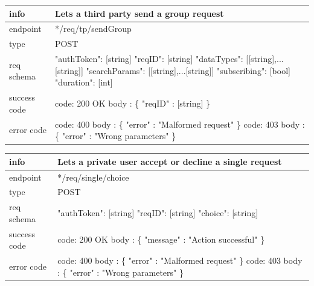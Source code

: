 \documentclass[titlepage]{article}
\begin{document}
\begin{tabularx}{\textwidth}{lX} \hline
    info & Lets a third party send a group request \\ \hline
    endpoint & */req/tp/sendGroup \\ \hline
    type & POST \\ \hline
    req schema &
    "authToken": [string] \newline
    "reqID": [string] \newline
    "dataTypes": [[string],...[string]] \newline
    "searchParams": [[string],...[string]] \newline
    "subscribing": [bool] \newline
    "duration": [int] \\ \hline
    success code &
        code: 200 OK \newline \newline 
        body : \{ \newline
        "reqID" : [string] \newline
        \} \\ \hline
    error code &
        code: 400 \newline
        body : \{ "error" : "Malformed request" \} \newline \newline
        code: 403 \newline
        body : \{ "error" : "Wrong parameters" \}\\ \hline
\end{tabularx}
		
\vspace{\baselineskip}

\begin{tabularx}{\textwidth}{lX} \hline
    info & Lets a private user accept or decline a single request \\ \hline
    endpoint & */req/single/choice \\ \hline
    type & POST \\ \hline
    req schema & 
    "authToken": [string] \newline
    "reqID": [string] \newline
    "choice": [string] \\ \hline
    success code &
        code: 200 OK \newline \newline 
        body : \{ \newline
        "message" : "Action successful" \newline
        \} \\ \hline
    error code &
        code: 400 \newline
        body : \{ "error" : "Malformed request" \} \newline \newline
        code: 403 \newline
        body : \{ "error" : "Wrong parameters" \}\\ \hline
\end{tabularx}
		
\end{document}
